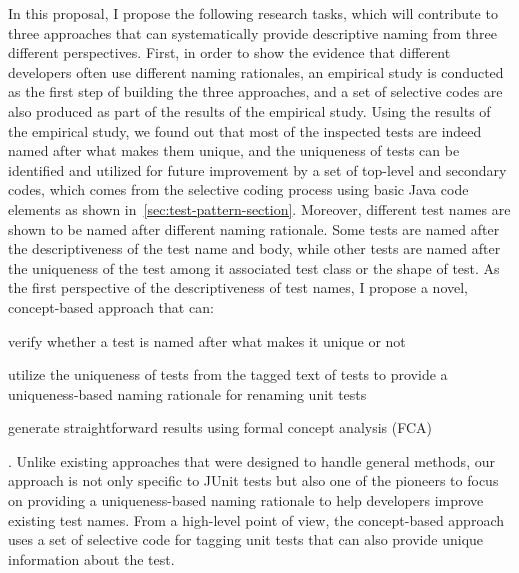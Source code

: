 In this proposal, I propose the following research tasks, which will contribute to three approaches that can systematically provide descriptive naming from three different perspectives.
%
First, in order to show the evidence that different developers often use different naming rationales, an empirical study is conducted as the first step of building the three approaches, and a set of selective codes are also produced as part of the results of the empirical study.
%
Using the results of the empirical study, we found out that most of the inspected tests are indeed named after what makes them unique, and the uniqueness of tests can be identified and utilized for future improvement by a set of top-level and secondary codes, which comes from the selective coding process using basic Java code elements as shown in~\cref{sec:test-pattern-section}.
%
Moreover, different test names are shown to be named after different naming rationale.
%
Some tests are named after the descriptiveness of the test name and body, while other tests are named after the uniqueness of the test among it associated test class or the shape of test.
%
As the first perspective of the descriptiveness of test names, I propose a novel, concept-based approach that can:
%
\begin{enumerate*}
\item verify whether a test is named after what makes it unique or not
\item utilize the uniqueness of tests from the tagged text of tests to provide a uniqueness-based naming rationale for renaming unit tests
\item generate straightforward results using formal concept analysis (FCA)~\cite{ganter2012formal}
\end{enumerate*}.
%
Unlike existing approaches that were designed to handle general methods, our approach is not only specific to JUnit tests but also one of the pioneers to focus on providing a uniqueness-based naming rationale to help developers improve existing test names.
%
From a high-level point of view, the concept-based approach uses a set of selective code for tagging unit tests that can also provide unique information about the test.


